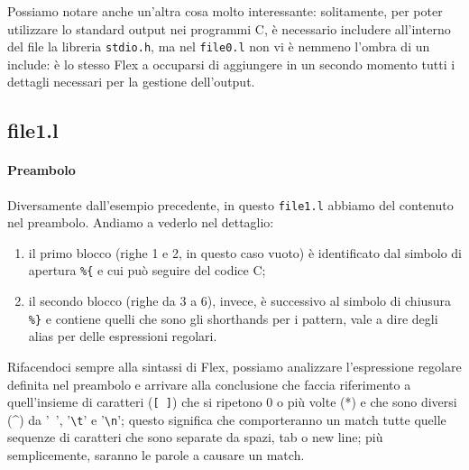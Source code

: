 \documentclass[class=book, crop=false, oneside, 12pt]{standalone}
\begin{document}
Possiamo notare anche un'altra cosa molto interessante: solitamente, per poter utilizzare lo standard output nei programmi C, è necessario includere all'interno del file la libreria \texttt{stdio.h}, ma nel \texttt{file0.l} non vi è nemmeno l'ombra di un include: è lo stesso Flex a occuparsi di aggiungere in un secondo momento tutti i dettagli necessari per la gestione dell'output.

\subsection*{file1.l}


\paragraph{Preambolo}
Diversamente dall'esempio precedente, in questo \texttt{file1.l} abbiamo del contenuto nel preambolo. Andiamo a vederlo nel dettaglio:

\begin{enumerate}
    \item il primo blocco (righe 1 e 2, in questo caso vuoto) è identificato dal simbolo di apertura \texttt{\%\{} e cui può seguire del codice C;
    \item il secondo blocco (righe da 3 a 6), invece, è successivo al simbolo di chiusura \texttt{\%\}} e contiene quelli che sono gli shorthands per i pattern, vale a dire degli alias per delle espressioni regolari.
\end{enumerate}

Rifacendoci sempre alla sintassi di Flex, possiamo analizzare l'espressione regolare definita nel preambolo e arrivare alla conclusione che faccia riferimento a quell'insieme di caratteri (\texttt{[ ]}) che si ripetono \(0\) o più volte (*) e che sono diversi (\^{}) da '\texttt{ }', '\texttt{\textbackslash t}' e '\texttt{\textbackslash n}'; questo significa che comporteranno un match tutte quelle sequenze di caratteri che sono separate da spazi, tab o new line; più semplicemente, saranno le parole a causare un match.
\end{document}
